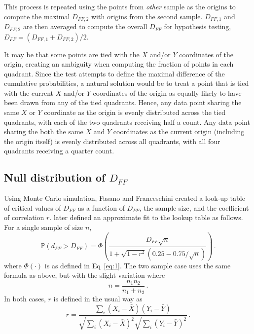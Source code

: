 \documentclass[codesnippet]{jss}
\newcommand{\RBnote}[1]{\textcolor{red}{#1}}
\begin{document}
This process is repeated using the points from \textit{other} sample
as the origins to compute the maximal $D_{FF,2}$ with origins from the
second sample. $D_{FF,1}$ and $D_{FF,2}$  are then averaged to compute
the overall $D_{FF}$ for hypothesis testing,
$D_{FF}=(D_{FF,1}+D_{FF,2})/2$.

It may be that some points are tied with the $X$ and/or $Y$
coordinates of the origin, creating an ambiguity when computing the
fraction of points in each quadrant. Since the
test attempts to define the maximal difference of the cumulative
probabilities, a natural solution would be to treat a point that is
tied with the current $X$ and/or $Y$ coordinates of the origin as equally
likely to have been drawn from any of the tied quadrants.
Hence, any data point
sharing the same $X$ or $Y$ coordinate as the origin is evenly
distributed across the tied quadrants, with each of the two quadrants
receiving half a count. Any data point sharing the both the same $X$ and $Y$
coordinates as the current origin (including the origin itself) is evenly
distributed across all quadrants, with all four quadrants receiving a
quarter count.

\subsection{Null distribution of $D_{FF}$}

Using Monte Carlo simulation, Fasano and Franceschini created a
look-up table of critical values of $D_{FF}$ as a function of
$D_{FF}$, the sample size, and the coefficient of correlation $r$.
\cite{numericalRecipes} later defined an approximate fit to the lookup table
as follows.
%
For a single sample of size $n$,
\begin{equation} \label{eq:4}
\mathbb{P}(d_{FF} > D_{FF}) = \Phi \left( \frac{D_{FF}\sqrt{n}}{1+\sqrt{1-r^2}(0.25-0.75/\sqrt{n})} \right) \, .
\end{equation}
where $\Phi(\cdot)$ is as defined in Eq~\ref{eq:1}.
The two sample case uses the same formula as above, but with the slight variation where
\begin{equation} \label{eq:5}
n = \frac{n_1n_2}{n_1+n_2}\, .
\end{equation}
In both cases, $r$ is defined in the usual way as
\begin{equation} \label{eq:6}
r = \frac{\sum_{i}(X_i-\bar{X})(Y_i-\bar{Y})}{\sqrt{\sum_{i}(X_i-\bar{X})^2}\sqrt{\sum_{i}(Y_i-\bar{Y})^2}}\, .
\end{equation}
\end{document}
